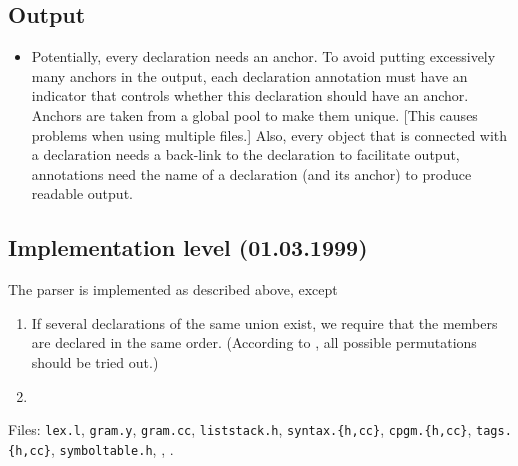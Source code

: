 \begin{docpart}
\subsection{Output}
\begin{itemize}
\item Potentially, every declaration needs an anchor. To avoid putting
  excessively many anchors in the output, each declaration annotation
  must have an indicator that controls whether this declaration should
  have an anchor. Anchors are taken from a global pool to make them
  unique. [This causes problems when using multiple files.] Also,
  every object that is connected with a declaration needs a back-link
  to the declaration to facilitate output, \ie annotations need the
  name of a declaration (and its anchor) to produce readable output.
\end{itemize}

\subsection{Implementation level (01.03.1999)}
\label{sec:ParserImplementationLevel}

The parser is implemented as described above, except
\begin{enumerate}
\item If several declarations of the same union exist, we require that
  the members are declared in the same order. (According to \ansiC, all
  possible permutations should be tried out.)
\item 
\end{enumerate}

Files: \texttt{lex.l}, \texttt{gram.y}, \texttt{gram.cc},
\texttt{liststack.h}, \texttt{syntax.\{h,cc\}},
\texttt{cpgm.\{h,cc\}}, \texttt{tags.\{h,cc\}},
\texttt{symboltable.h}, \texttt{}, \texttt{}. 


\end{docpart}

